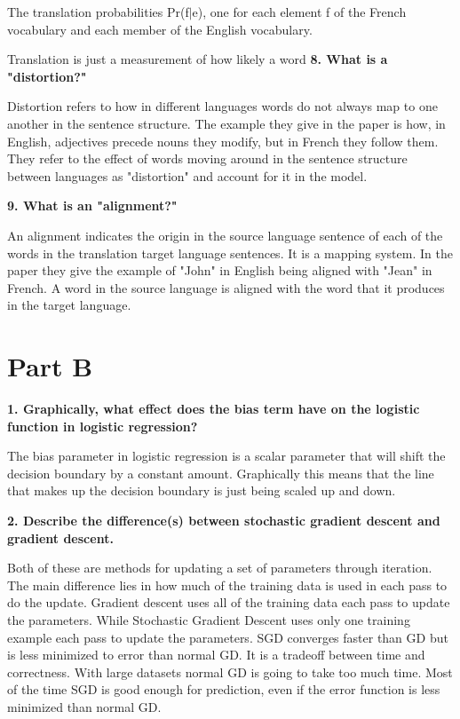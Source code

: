\documentclass[11pt, oneside]{article}   	%
\begin{document}
The translation probabilities Pr(f$|$e), one for each element f of the French vocabulary  and each member of the English vocabulary.

Translation is just a measurement of how likely a word
\textbf{8. What is a "distortion?"}

Distortion refers to how in different languages words do not always map to one another in the sentence structure. The example they give in the paper is how, in English, adjectives precede nouns they modify, but in French they follow them. They refer to the effect of words moving around in the sentence structure between languages as "distortion" and account for it in the model. 

\textbf{9. What is an "alignment?"}

An alignment indicates the origin in the source language sentence of each of the words in the translation target language sentences. It is a mapping system. In the paper they give the example of "John" in English being aligned with "Jean" in French. A word in the source language is aligned with the word that it produces in the target language.


\section{Part B}

\textbf{1. Graphically, what effect does the bias term have on the logistic function in logistic regression?}

The bias parameter in logistic regression is a scalar parameter that will shift the decision boundary by a constant amount. Graphically this means that the line that makes up the decision boundary is just being scaled up and down. 

\textbf{2. Describe the difference(s) between stochastic gradient descent and gradient descent.}

Both of these are methods for updating a set of parameters through iteration. The main difference lies in how much of the training data is used in each pass to do the update. Gradient descent uses all of the training data each pass to update the parameters. While Stochastic Gradient Descent uses only one training example each pass to update the parameters. SGD converges faster than GD but is less minimized to error than normal GD. It is a tradeoff between time and correctness. With large datasets normal GD is going to take too much time. Most of the time SGD is good enough for prediction, even if the error function is less minimized than normal GD. 
\end{document}
